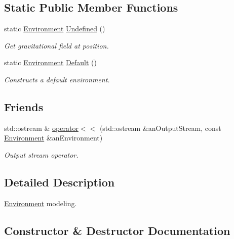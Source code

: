 \subsection*{Static Public Member Functions}
\begin{DoxyCompactItemize}
\item 
static \hyperlink{classlibrary_1_1physics_1_1_environment}{Environment} \hyperlink{classlibrary_1_1physics_1_1_environment_a8d1dfff3867d59ecdebd3ee6e98a2dab}{Undefined} ()
\begin{DoxyCompactList}\small\item\em Get gravitational field at position. \end{DoxyCompactList}\item 
static \hyperlink{classlibrary_1_1physics_1_1_environment}{Environment} \hyperlink{classlibrary_1_1physics_1_1_environment_a7fcc57999bfb9c0c7e70b7cc783e30c8}{Default} ()
\begin{DoxyCompactList}\small\item\em Constructs a default environment. \end{DoxyCompactList}\end{DoxyCompactItemize}
\subsection*{Friends}
\begin{DoxyCompactItemize}
\item 
std\+::ostream \& \hyperlink{classlibrary_1_1physics_1_1_environment_a7bc4b39898452fbe5ce3a8de75ad2596}{operator$<$$<$} (std\+::ostream \&an\+Output\+Stream, const \hyperlink{classlibrary_1_1physics_1_1_environment}{Environment} \&an\+Environment)
\begin{DoxyCompactList}\small\item\em Output stream operator. \end{DoxyCompactList}\end{DoxyCompactItemize}


\subsection{Detailed Description}
\hyperlink{classlibrary_1_1physics_1_1_environment}{Environment} modeling. 

\subsection{Constructor \& Destructor Documentation}
\mbox{\label{classlibrary_1_1physics_1_1_environment_a51854f130c31eb075ea623e332978495}} 
